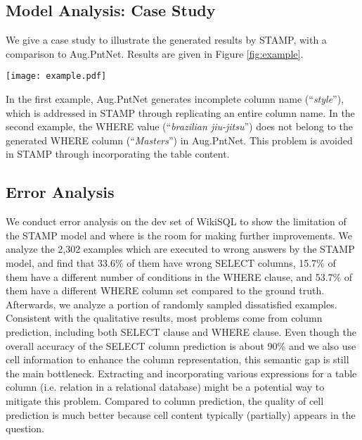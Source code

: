 \documentclass[11pt,a4paper]{article}
\begin{document}
\subsection{Model Analysis: Case Study}
We give a case study to illustrate the generated results by STAMP, with a comparison to Aug.PntNet.
Results are given in Figure \ref{fig:example}.
\begin{figure*}[t]
	\centering
	\texttt{[image: example.pdf]}
	\caption{Case study on the dev set between Aug.PntNet and STAMP. These two questions are based on the same table. Each question is followed by the generated SQL queries from the two approaches.}
	\label{fig:example}
\end{figure*}
In the first example, Aug.PntNet generates incomplete column name (``\textit{style}''), which is addressed in STAMP through replicating an entire column name.
In the second example, the WHERE value (``\textit{brazilian jiu-jitsu}'') does not belong to the generated WHERE column  ({``\textit{Masters}''}) in Aug.PntNet. This problem is avoided in STAMP through incorporating the table content.



\subsection{Error Analysis}
We conduct error analysis on the dev set of WikiSQL to show the limitation of the STAMP model and where is the room for making further improvements.
We analyze the 2,302 examples which are executed to wrong answers by the STAMP model, and find that 33.6\% of them have wrong SELECT columns, 15.7\%  of them have a different number of conditions in the WHERE clause, and 53.7\% of them have a different WHERE column set compared to the ground truth.
Afterwards, we analyze a portion of randomly sampled dissatisfied examples.
Consistent with the qualitative results, most problems come from column prediction, including both SELECT clause and WHERE clause. Even though the overall accuracy of the SELECT column prediction is about 90\% and we also use cell information to enhance the column representation, this semantic gap is still the main bottleneck.
Extracting and incorporating various expressions for a table column (i.e. relation in a relational database) might be a potential way to mitigate this problem.
Compared to column prediction, the quality of cell prediction is much better because cell content typically (partially) appears in the question.
\end{document}
